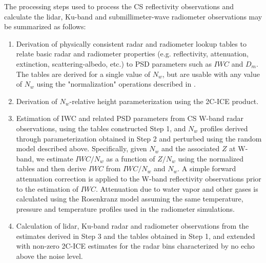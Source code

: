 \documentclass{ametsocV6.1}
\begin{document}
The processing steps used to process the CS reflectivity observations and calculate the lidar, Ku-band and submillimeter-wave radiometer observations may be summarized as follows:
\begin{enumerate}
\item Derivation of physically consistent radar and radiometer lookup tables to relate basic radar and radiometer properties (e.g. reflectivity, attenuation, extinction, scattering-albedo, etc.) to PSD parameters such as $IWC$ and $D_m$. The tables are derived for a single value of $N_w$, but are usable with any value of $N_w$ using the "normalization" operations described in \citep{grecu2011}.
\item Derivation of $N_w$-relative height parameterization using the 2C-ICE product.
\item Estimation of IWC and related PSD parameters from CS W-band radar observations, using the tables constructed Step 1, and $N_w$ profiles derived through parameterization obtained in Step 2 and perturbed using the random model described above. Specifically, given $N_w$ and the associated $Z$ at W-band, we estimate $IWC/N_w$ as a function of $Z/N_w$ using the normalized tables and then derive $IWC$ from $IWC/N_w$ and $N_w$.  A simple forward attenuation correction \citep{meneghini1978} is applied to the W-band reflectivity observations prior to the estimation of $IWC$.  Attenuation due to water vapor and other gases is calculated using the Rosenkranz model \citep{rosenkranz1998} assuming the same temperature, pressure and temperature profiles used in the radiometer simulations.

\item Calculation of lidar, Ku-band radar and radiometer observations from the estimates derived in Step 3 and the tables obtained in Step 1, and extended with non-zero 2C-ICE estimates for the radar bins characterized by no echo
above the noise level.
\end{enumerate}
\end{document}
